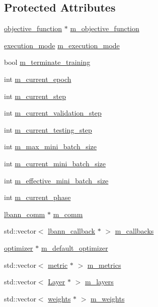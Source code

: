 \subsection*{Protected Attributes}
\begin{DoxyCompactItemize}
\item 
\hyperlink{classlbann_1_1objective__function}{objective\+\_\+function} $\ast$ \hyperlink{classlbann_1_1model_a24c50e7108dd7698671aed7df5b22e8b}{m\+\_\+objective\+\_\+function}
\item 
\hyperlink{base_8hpp_a2781a159088df64ed7d47cc91c4dc0a8}{execution\+\_\+mode} \hyperlink{classlbann_1_1model_a2166e2aad256a335ace3bdcae5da2614}{m\+\_\+execution\+\_\+mode}
\item 
bool \hyperlink{classlbann_1_1model_a639f9c3fcb81b905085f8b1932f8920f}{m\+\_\+terminate\+\_\+training}
\item 
int \hyperlink{classlbann_1_1model_a305fac94b9063e59198c7f936923221a}{m\+\_\+current\+\_\+epoch}
\item 
int \hyperlink{classlbann_1_1model_af31a76afc53061747d2170a65e98f692}{m\+\_\+current\+\_\+step}
\item 
int \hyperlink{classlbann_1_1model_af69e5f6bf49a4990fd4c18984705ab87}{m\+\_\+current\+\_\+validation\+\_\+step}
\item 
int \hyperlink{classlbann_1_1model_a2acf043862ba878cb7a91cb0d26c3791}{m\+\_\+current\+\_\+testing\+\_\+step}
\item 
int \hyperlink{classlbann_1_1model_acc496503e7cf8d635e5a31ba09b3c81a}{m\+\_\+max\+\_\+mini\+\_\+batch\+\_\+size}
\item 
int \hyperlink{classlbann_1_1model_a982cea92d230bab5a47df504f02daf98}{m\+\_\+current\+\_\+mini\+\_\+batch\+\_\+size}
\item 
int \hyperlink{classlbann_1_1model_a4887fd2816e7c51b24cb8bf8e4a80a1c}{m\+\_\+effective\+\_\+mini\+\_\+batch\+\_\+size}
\item 
int \hyperlink{classlbann_1_1model_a150ef033f81982936e007b10c421f488}{m\+\_\+current\+\_\+phase}
\item 
\hyperlink{classlbann_1_1lbann__comm}{lbann\+\_\+comm} $\ast$ \hyperlink{classlbann_1_1model_a0eabaf2b2f829fd5db3dfd26df420df0}{m\+\_\+comm}
\item 
std\+::vector$<$ \hyperlink{classlbann_1_1lbann__callback}{lbann\+\_\+callback} $\ast$ $>$ \hyperlink{classlbann_1_1model_a07b511fef30368494c2ad80922ffd0eb}{m\+\_\+callbacks}
\item 
\hyperlink{classlbann_1_1optimizer}{optimizer} $\ast$ \hyperlink{classlbann_1_1model_a68df9efe547f53f7bf2a03ac64527990}{m\+\_\+default\+\_\+optimizer}
\item 
std\+::vector$<$ \hyperlink{classlbann_1_1metric}{metric} $\ast$ $>$ \hyperlink{classlbann_1_1model_ae75c9aafe9e5a93980cc1bbae986bc79}{m\+\_\+metrics}
\item 
std\+::vector$<$ \hyperlink{classlbann_1_1Layer}{Layer} $\ast$ $>$ \hyperlink{classlbann_1_1model_a0229fc226ec163d1411548446104569d}{m\+\_\+layers}
\item 
std\+::vector$<$ \hyperlink{classlbann_1_1weights}{weights} $\ast$ $>$ \hyperlink{classlbann_1_1model_aaf9adefe4497d90bf5bc2567e71bfb00}{m\+\_\+weights}
\end{DoxyCompactItemize}
